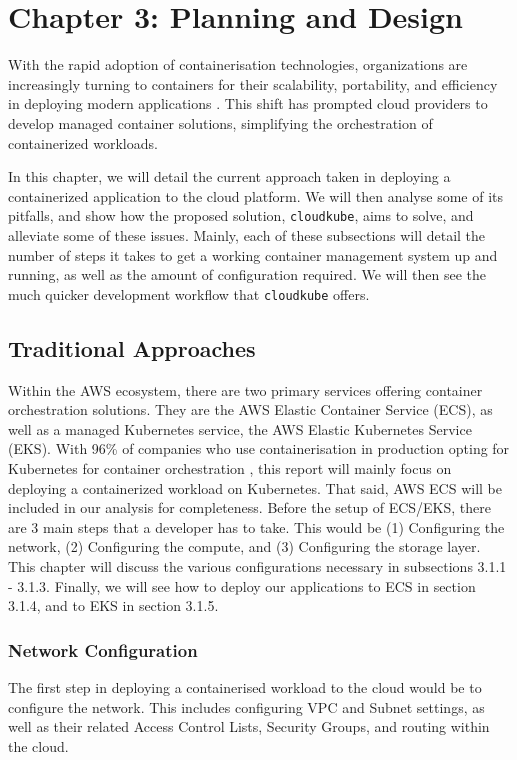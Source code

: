 \chapter{Chapter 3: Planning and Design}
With the rapid adoption of containerisation technologies, organizations are increasingly turning to containers for their scalability, portability, and efficiency in deploying modern applications \cite{gartner-2024}. This shift has prompted cloud providers to develop managed container solutions, simplifying the orchestration of containerized workloads. 

In this chapter, we will detail the current approach taken in deploying a containerized application to the cloud platform. We will then analyse some of its pitfalls, and show how the proposed solution, \texttt{cloudkube}, aims to solve, and alleviate some of these issues. Mainly, each of these subsections will detail the number of steps it takes to get a working container management system up and running, as well as the amount of configuration required. We will then see the much quicker development workflow that \texttt{cloudkube} offers.

\section{Traditional Approaches}
Within the AWS ecosystem, there are two primary services offering container orchestration solutions. They are the AWS Elastic Container Service (ECS), as well as a managed Kubernetes service, the AWS Elastic Kubernetes Service (EKS). With 96\% of companies who use containerisation in production opting for Kubernetes for container orchestration \cite{unlu-2024}, this report will mainly focus on deploying a containerized workload on Kubernetes. That said, AWS ECS will be included in our analysis for completeness. 
Before the setup of ECS/EKS, there are 3 main steps that a developer has to take. This would be (1) Configuring the network, (2) Configuring the compute, and (3) Configuring the storage layer. This chapter will discuss the various configurations necessary in subsections 3.1.1 - 3.1.3. Finally, we will see how to
deploy our applications to ECS in section 3.1.4, and to EKS in section 3.1.5. 
\newpage

\subsection{Network Configuration}
The first step in deploying a containerised workload to the cloud would be to configure the network. This includes configuring VPC and Subnet settings, as well as their related Access Control Lists, Security Groups, and routing within the cloud. 

